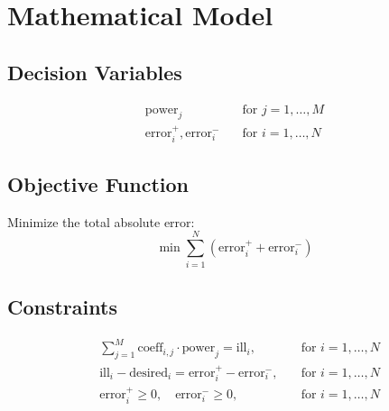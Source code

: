 \documentclass{article}
\begin{document}
\section*{Mathematical Model}

\subsection*{Decision Variables}
\begin{align*}
\text{power}_j & \quad \text{for } j = 1, \dots, M \\
\text{error}_i^{+}, \text{error}_i^{-} & \quad \text{for } i = 1, \dots, N
\end{align*}

\subsection*{Objective Function}
Minimize the total absolute error:
\[
\min \sum_{i=1}^{N} (\text{error}_i^{+} + \text{error}_i^{-})
\]

\subsection*{Constraints}
\begin{align*}
& \sum_{j=1}^{M} \text{coeff}_{i,j} \cdot \text{power}_j = \text{ill}_i, & \quad \text{for } i = 1, \dots, N \\
& \text{ill}_i - \text{desired}_i = \text{error}_i^{+} - \text{error}_i^{-}, & \quad \text{for } i = 1, \dots, N \\
& \text{error}_i^{+} \geq 0, \quad \text{error}_i^{-} \geq 0, & \quad \text{for } i = 1, \dots, N
\end{align*}
\end{document}
